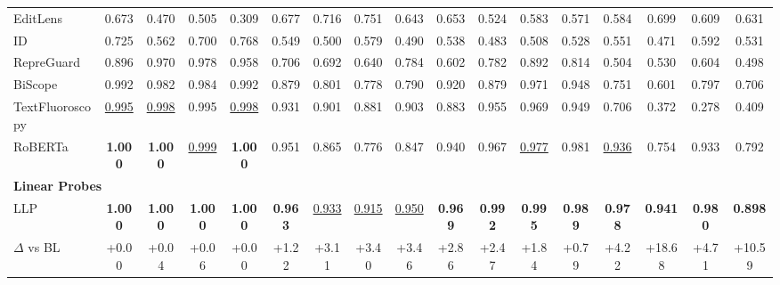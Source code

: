 \begin{tabular}{lcccccccccccccccc}
EditLens & 0.673 & 0.470 & 0.505 & 0.309 & 0.677 & 0.716 & 0.751 & 0.643 & 0.653 & 0.524 & 0.583 & 0.571 & 0.584 & 0.699 & 0.609 & 0.631 \\
ID & 0.725 & 0.562 & 0.700 & 0.768 & 0.549 & 0.500 & 0.579 & 0.490 & 0.538 & 0.483 & 0.508 & 0.528 & 0.551 & 0.471 & 0.592 & 0.531 \\
RepreGuard & 0.896 & 0.970 & 0.978 & 0.958 & 0.706 & 0.692 & 0.640 & 0.784 & 0.602 & 0.782 & 0.892 & 0.814 & 0.504 & 0.530 & 0.604 & 0.498 \\
BiScope & 0.992 & 0.982 & 0.984 & 0.992 & 0.879 & 0.801 & 0.778 & 0.790 & 0.920 & 0.879 & 0.971 & 0.948 & 0.751 & 0.601 & 0.797 & 0.706 \\
TextFluoroscopy & \cellcolor{orange!25}\underline{0.995} & \cellcolor{orange!25}\underline{0.998} & 0.995 & \cellcolor{orange!25}\underline{0.998} & 0.931 & 0.901 & 0.881 & 0.903 & 0.883 & 0.955 & 0.969 & 0.949 & 0.706 & 0.372 & 0.278 & 0.409 \\
RoBERTa & \cellcolor{cyan!25}\textbf{1.000} & \cellcolor{cyan!25}\textbf{1.000} & \cellcolor{orange!25}\underline{0.999} & \cellcolor{cyan!25}\textbf{1.000} & 0.951 & 0.865 & 0.776 & 0.847 & 0.940 & 0.967 & \cellcolor{orange!25}\underline{0.977} & 0.981 & \cellcolor{orange!25}\underline{0.936} & 0.754 & 0.933 & 0.792 \\
\midrule
\multicolumn{17}{l}{\textbf{Linear Probes}} \\
\midrule
LLP & \cellcolor{cyan!25}\textbf{1.000} & \cellcolor{cyan!25}\textbf{1.000} & \cellcolor{cyan!25}\textbf{1.000} & \cellcolor{cyan!25}\textbf{1.000} & \cellcolor{cyan!25}\textbf{0.963} & \cellcolor{orange!25}\underline{0.933} & \cellcolor{orange!25}\underline{0.915} & \cellcolor{orange!25}\underline{0.950} & \cellcolor{cyan!25}\textbf{0.969} & \cellcolor{cyan!25}\textbf{0.992} & \cellcolor{cyan!25}\textbf{0.995} & \cellcolor{cyan!25}\textbf{0.989} & \cellcolor{cyan!25}\textbf{0.978} & \cellcolor{cyan!25}\textbf{0.941} & \cellcolor{cyan!25}\textbf{0.980} & \cellcolor{cyan!25}\textbf{0.898} \\
\hspace*{1em}$\Delta$ vs BL & \textcolor{green!60!black}{+0.00} & \textcolor{green!60!black}{+0.04} & \textcolor{green!60!black}{+0.06} & \textcolor{green!60!black}{+0.00} & \textcolor{green!60!black}{+1.22} & \textcolor{green!60!black}{+3.11} & \textcolor{green!60!black}{+3.40} & \textcolor{green!60!black}{+3.46} & \textcolor{green!60!black}{+2.86} & \textcolor{green!60!black}{+2.47} & \textcolor{green!60!black}{+1.84} & \textcolor{green!60!black}{+0.79} & \textcolor{green!60!black}{+4.22} & \textcolor{green!60!black}{+18.68} & \textcolor{green!60!black}{+4.71} & \textcolor{green!60!black}{+10.59} \\

\end{tabular}
